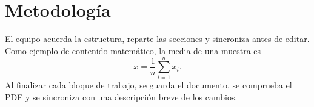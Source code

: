 \section{Metodología}
El equipo acuerda la estructura, reparte las secciones y sincroniza antes de
editar. Como ejemplo de contenido matemático, la media de una muestra es
\begin{equation}
    \bar{x} = \frac{1}{n}\sum_{i=1}^{n} x_i.
\end{equation}
Al finalizar cada bloque de trabajo, se guarda el documento, se comprueba
el PDF y se sincroniza con una descripción breve de los cambios.
